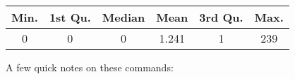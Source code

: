 \documentclass[]{book}
\theoremstyle{definition}
\theoremstyle{definition}
\theoremstyle{definition}
\theoremstyle{remark}
\begin{document}
\begin{longtable}[]{@{}cccccc@{}}
\toprule
\begin{minipage}[b]{0.08\columnwidth}\centering\strut
Min.\strut
\end{minipage} & \begin{minipage}[b]{0.12\columnwidth}\centering\strut
1st Qu.\strut
\end{minipage} & \begin{minipage}[b]{0.10\columnwidth}\centering\strut
Median\strut
\end{minipage} & \begin{minipage}[b]{0.09\columnwidth}\centering\strut
Mean\strut
\end{minipage} & \begin{minipage}[b]{0.12\columnwidth}\centering\strut
3rd Qu.\strut
\end{minipage} & \begin{minipage}[b]{0.07\columnwidth}\centering\strut
Max.\strut
\end{minipage}\tabularnewline
\midrule
\endhead
\begin{minipage}[t]{0.08\columnwidth}\centering\strut
0\strut
\end{minipage} & \begin{minipage}[t]{0.12\columnwidth}\centering\strut
0\strut
\end{minipage} & \begin{minipage}[t]{0.10\columnwidth}\centering\strut
0\strut
\end{minipage} & \begin{minipage}[t]{0.09\columnwidth}\centering\strut
1.241\strut
\end{minipage} & \begin{minipage}[t]{0.12\columnwidth}\centering\strut
1\strut
\end{minipage} & \begin{minipage}[t]{0.07\columnwidth}\centering\strut
239\strut
\end{minipage}\tabularnewline
\bottomrule
\end{longtable}

A few quick notes on these commands:
\end{document}
